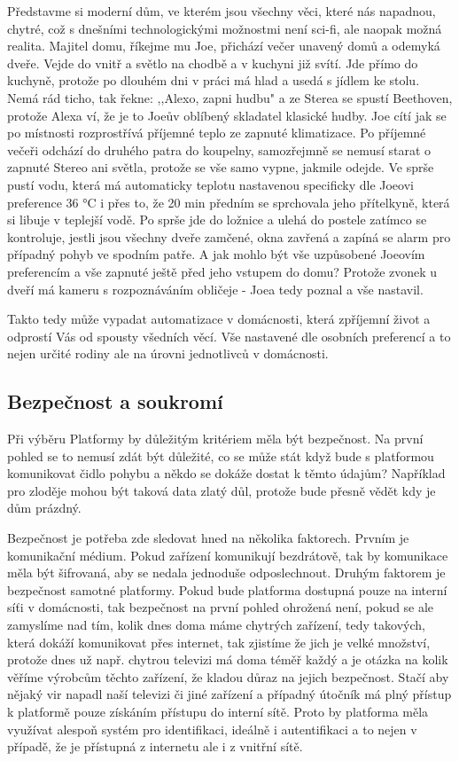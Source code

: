 Představme si moderní dům, ve kterém jsou všechny věci, které nás napadnou, chytré, což s dnešními technologickými možnostmi není sci-fi, ale naopak možná realita. Majitel domu, říkejme mu Joe, přichází večer unavený domů a odemyká dveře. Vejde do vnitř a světlo na chodbě a v kuchyni již svítí. Jde přímo do kuchyně, protože po dlouhém dni v práci má hlad a usedá s jídlem ke stolu. Nemá rád ticho, tak řekne: ,,Alexo, zapni hudbu" a ze Sterea se spustí Beethoven, protože Alexa ví, že je to Joeův oblíbený skladatel klasické hudby. Joe cítí jak se po místnosti rozprostřívá příjemné teplo ze zapnuté klimatizace. Po příjemné večeři odchází do druhého patra do koupelny, samozřejmně se nemusí starat o zapnuté Stereo ani světla, protože se vše samo vypne, jakmile odejde. Ve sprše pustí vodu, která má automaticky teplotu nastavenou specificky dle Joeovi preference 36 °C i přes to, že 20 min předním se sprchovala jeho přítelkyně, která si libuje v teplejší vodě. Po sprše jde do ložnice a ulehá do postele zatímco se kontroluje, jestli jsou všechny dveře zamčené, okna zavřená a zapíná se alarm pro případný pohyb ve spodním patře. A jak mohlo být vše uzpůsobené Joeovím preferencím a vše zapnuté ještě před jeho vstupem do domu? Protože zvonek u dveří má kameru s rozpoznáváním obličeje - Joea tedy poznal a vše nastavil.

Takto tedy může vypadat automatizace v domácnosti, která zpříjemní život a odprostí Vás od spousty všedních věcí. Vše nastavené dle osobních preferencí a to nejen určité rodiny ale na úrovni jednotlivců v domácnosti.


\subsection{Bezpečnost a soukromí}
Při výběru Platformy by důležitým kritériem měla být bezpečnost. Na první pohled se to nemusí zdát být důležité, co se může stát když bude s platformou komunikovat čidlo pohybu a někdo se dokáže dostat k těmto údajům? Například pro zloděje mohou být taková data zlatý důl, protože bude přesně vědět kdy je dům prázdný.

Bezpečnost je potřeba zde sledovat hned na několika faktorech. Prvním je komunikační médium. Pokud zařízení komunikují bezdrátově, tak by komunikace měla být šifrovaná, aby se nedala jednoduše odposlechnout. Druhým faktorem je bezpečnost samotné platformy. Pokud bude platforma dostupná pouze na interní síťi v domácnosti, tak bezpečnost na první pohled ohrožená není, pokud se ale zamyslíme nad tím, kolik dnes doma máme chytrých zařízení, tedy takových, která dokáží komunikovat přes internet, tak zjistíme že jich je velké množství, protože dnes už např. chytrou televizi má doma téměř každý a je otázka na kolik věříme výrobcům těchto zařízení, že kladou důraz na jejich bezpečnost. Stačí aby nějaký vir napadl naší televizi či jiné zařízení a případný útočník má plný přístup k platformě pouze získáním přístupu do interní sítě. Proto by platforma měla využívat alespoň systém pro identifikaci, ideálně i autentifikaci a to nejen v případě, že je přístupná z internetu ale i z vnitřní sítě.

